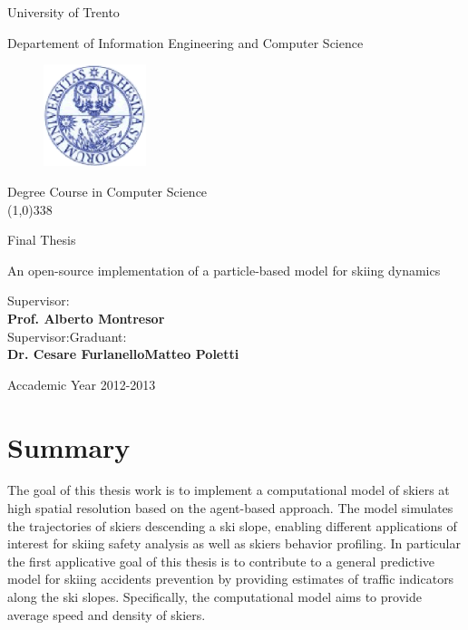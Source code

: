 \documentclass[12pt,a4paper,twoside]{book}
\begin{document}
\begin{titlepage}
  \begin{center}
    \begin{Large}University of Trento\\\end{Large}
     Departement of Information Engineering and Computer Science  \\
     \vspace{10pt}
     \begin{figure}[htbp]
       \begin{center}
         \includegraphics[width=3cm]{images/sigillo_unitn.eps}
       \end{center}
     \end{figure}
Degree Course in Computer Science\\

\vspace{10pt}
\line(1,0){338}
\vspace{10pt}

Final Thesis\\
\end{center}
\vspace{3cm}
\begin{center}
\begin{Large}An open-source implementation of a particle-based model for skiing dynamics\\\end{Large}
\vspace{3cm}
\end{center}
Supervisor: \\ \textbf{Prof. Alberto Montresor} \\
Supervisor:\hspace{7.76cm}Graduant:   \\
\textbf{Dr. Cesare Furlanello}\hspace{4.9cm}\textbf{Matteo Poletti}
\vspace{1cm}
\begin{center}
Accademic Year 2012-2013
\end{center}
\end{titlepage}

\chapter*{Summary}
The goal of this thesis work is to implement a computational model of skiers at high spatial resolution based on the agent-based approach. The model simulates the trajectories of skiers descending a ski slope, enabling different applications of interest for skiing safety analysis as well as skiers behavior profiling. In particular the first applicative goal of this thesis is to contribute to a general predictive model for skiing accidents prevention by providing estimates of traffic indicators along the ski slopes. Specifically, the computational model aims to provide average speed and density of skiers.
\end{document}
